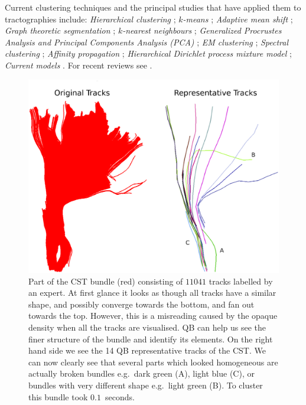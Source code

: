 \documentclass{bioinfo}
\begin{document}
Current clustering techniques and the principal studies that have
applied them to tractographies include: \textit{Hierarchical clustering}
\cite{Visser2010, gerig2004analysis, Guevara2010, zhang2005dti,
  jianu2009exploring}; \textit{$k$-means} \cite{ElKouby2005, Tsai2007};
\textit{Adaptive mean shift} \cite{zvitia2008adaptive, Zvitia2010};
\textit{Graph theoretic segmentation} \cite{brun2004clustering};
\textit{$k$-nearest neighbours} \cite{Ding2003a}; \textit{Generalized
  Procrustes Analysis and Principal Components Analysis (PCA)}
\cite{Corouge2004, corouge2004towards, Corouge2006};
\textit{EM clustering} \cite{Maddah_MICCA2005, maddah2006statistical,
  Maddah_IEEEBI2008, ziyan2009consistency}; \textit{Spectral clustering}
\cite{jonasson2005fiber, ODonnell_IEEETMI07}; \textit{Affinity
  propagation} \cite{leemans17new, malcolm2009filtered};
\textit{Hierarchical Dirichlet process mixture model}
\cite{wang2010tractography}; \textit{Current models}
\cite{Durrleman2009, durrleman2010registration}. 
For recent reviews see \cite{ODonnell_IEEETMI07, wang2010tractography}.

%
\begin{figure}[ht]
\begin{centering}
\includegraphics[scale=0.26]{Figures/Fig_4_cst_simplification_relabeled}
\par\end{centering}
\caption{Part of the CST bundle (red) consisting of $11041$ tracks
  labelled by an expert. At first glance it looks as though all tracks
  have a similar shape, and possibly converge towards the bottom, and
  fan out towards the top. However, this is a misreading caused by the
  opaque density when all the tracks are visualised.  QB can help us see
  the finer structure of the bundle and identify its elements. On the
  right hand side we see the 14 QB representative tracks of the CST. We
  can now clearly see that several parts which looked homogeneous are
  actually broken bundles e.g.~dark green (A), light blue (C), or
  bundles with very different shape e.g.~light green (B). To cluster
  this bundle took $0.1$~seconds.\label{Flo:cst_pbc}}
\end{figure}
\end{document}
